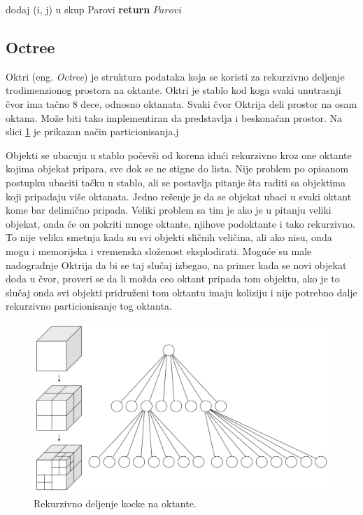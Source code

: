 \documentclass[a4paper]{article}
\begin{document}
{\begin{algorithm}
\begin{algorithmic}[1]
				\State dodaj (i, j) u skup Parovi
			\EndIf		
		\EndFor
		\EndFor
		\State \textbf{return} $Parovi$
		\EndProcedure
    \end{algorithmic}
\end{algorithm}

\subsection{Octree}
\label{subsec:octree}

Oktri (eng. {\em Octree}) je struktura podataka koja se koristi za rekurzivno deljenje trodimenzionog
prostora na oktante. Oktri je stablo kod koga svaki unutrasnji čvor ima tačno 8 dece, odnosno oktanata. 
Svaki čvor Oktrija deli prostor na osam oktana.
Može biti tako implementiran da predstavlja i beskonačan prostor.
Na slici \ref{fig:oct} je prikazan način particionisanja.j

Objekti se ubacuju u stablo počevši od korena idući rekurzivno kroz one oktante kojima objekat pripara,
sve dok se ne stigne do lista.
Nije problem po opisanom postupku ubaciti tačku u stablo, ali se postavlja pitanje šta raditi sa objektima
koji pripadaju više oktanata.
Jedno rešenje je da se objekat ubaci u svaki oktant kome bar delimično pripada. 
Veliki problem sa tim je ako je u pitanju veliki objekat, onda će on pokriti mnoge oktante, njihove 
podoktante i tako rekurzivno. To nije velika smetnja kada su svi objekti sličnih veličina, ali ako 
nisu, onda mogu i memorijska i vremenska složenost eksplodirati. 
Moguće su male nadogradnje Oktrija da bi se taj slučaj izbegao, na primer kada se novi objekat doda 
u čvor, proveri se da li možda ceo oktant pripada tom objektu, ako je to slučaj onda svi objekti pridruženi
tom oktantu imaju koliziju i nije potrebno dalje rekurzivno particionisanje tog oktanta.

\begin{figure}[h!]
	\begin{center}
	\includegraphics[scale=0.15]{octree.png}
	\end{center}
	\caption{Rekurzivno deljenje kocke na oktante.}
	\label{fig:oct}
\end{figure}



}
\end{document}
